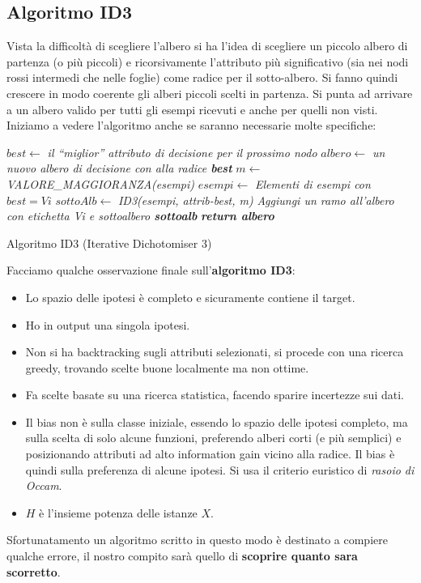 \subsection{Algoritmo ID3}
Vista la difficoltà di scegliere l'albero si ha l'idea di scegliere un piccolo
albero di partenza (o più piccoli) e ricorsivamente l'attributo più
significativo (sia nei nodi rossi intermedi che nelle foglie) come radice per il
sotto-albero. Si fanno quindi crescere in modo 
coerente gli alberi piccoli scelti in partenza. Si punta ad arrivare a un
albero valido per tutti gli esempi ricevuti e anche per quelli non visti.\\
Iniziamo a vedere l'algoritmo anche se saranno necessarie molte specifiche:
\begin{algorithm}[H]
  \begin{algorithmic}
    \EndIf
    \EndIf
    \EndIf
    \State $best \gets$ \textit{il ``miglior'' attributo di decisione per il
    prossimo nodo}
    \State $albero \gets$ \textit{un nuovo albero di decisione con alla radice \textbf{best}}
    \State $m \gets$ \textit{VALORE\_MAGGIORANZA(esempi)}
    \State $esempi \gets$ \textit{Elementi di esempi con $best = Vi$}
    \State $sottoAlb \gets$ \textit{ID3(esempi, attrib-best, m)}
    \State \textit{Aggiungi un ramo all'albero con etichetta Vi e sottoalbero \textbf{sottoalb}}
    \EndFor
    \State \textit{\textbf{return albero}}
    \EndFunction
  \end{algorithmic}
  \caption{Algoritmo ID3 (Iterative Dichotomiser 3)}
\end{algorithm}
Facciamo qualche osservazione finale sull'\textbf{algoritmo ID3}:
\begin{itemize}
  \item Lo spazio delle ipotesi è completo e sicuramente contiene il target.
  \item Ho in output una singola ipotesi.
  \item Non si ha backtracking sugli attributi selezionati, si procede con una
  ricerca greedy, trovando scelte buone localmente ma non ottime.
  \item Fa scelte basate su una ricerca statistica, facendo sparire incertezze
  sui dati.
  \item Il bias non è sulla classe iniziale, essendo lo spazio delle ipotesi
  completo, ma sulla scelta di solo alcune funzioni, preferendo alberi corti (e
  più semplici) e posizionando attributi ad alto information gain vicino alla
  radice. Il bias è quindi sulla preferenza di alcune ipotesi. Si usa il
  criterio euristico di \textit{rasoio di Occam}.
  \item $H$ è l'insieme potenza delle istanze $X$.
\end{itemize}
Sfortunatamento un algoritmo scritto in questo modo è destinato a compiere qualche errore, il nostro compito sarà quello di \textbf{scoprire quanto sara scorretto}.
